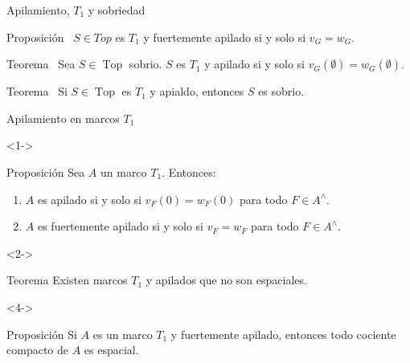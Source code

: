 \documentclass[compress,12pt]{beamer}
\DeclareMathOperator{\Top}{Top}
\begin{document}
\begin{frame}{Apilamiento, $T_1$ y sobriedad}
\begin{block}{Proposición~\cite[Sexton-Simmons (2003)]{sexton2003}}
$S\in Top$ es $T_1$ y fuertemente apilado si y solo si $v_G=w_G$.    
\end{block}

\begin{block}{Teorema~\cite[Simmons (2004)]{simmons2004vietoris}}
Sea $S\in \Top$ sobrio. $S$ es $T_1$ y apilado si y solo si $v_G(\emptyset)=w_G(\emptyset)$.    
\end{block}

\begin{block}{Teorema~\cite[Sexton-Simmons (2006)]{sexton2006ordinal}}
    Si $S\in \Top$ es $T_1$ y apialdo, entonces $S$ es sobrio.
\end{block}
\end{frame}


\begin{frame}{Apilamiento en marcos $T_1$}

\begin{uncoverenv}<1->
\begin{block}{Proposición}
Sea $A$ un marco $T_1$. Entonces:
\begin{enumerate}
    \item $A$ es apilado si y solo si
    \(
        v_F(0)=w_F(0)
    \) para todo $F\in A^\wedge$.
    \item $A$ es fuertemente apilado si y solo si
    \(
        v_F=w_F
    \) para todo $F\in A^\wedge$.
\end{enumerate}
\end{block}
\end{uncoverenv}
\begin{uncoverenv}<2->
\begin{block}{Teorema}
Existen marcos $T_1$ y apilados
que \alert<3->{no son espaciales}.
\end{block}
\end{uncoverenv}
\begin{uncoverenv}<4->
\begin{block}{Proposición}
Si $A$ es un marco $T_1$ y fuertemente
apilado, entonces \alert<5->{todo cociente compacto
de $A$ es espacial}.
\end{block}
\end{uncoverenv}

\end{frame}
\end{document}

